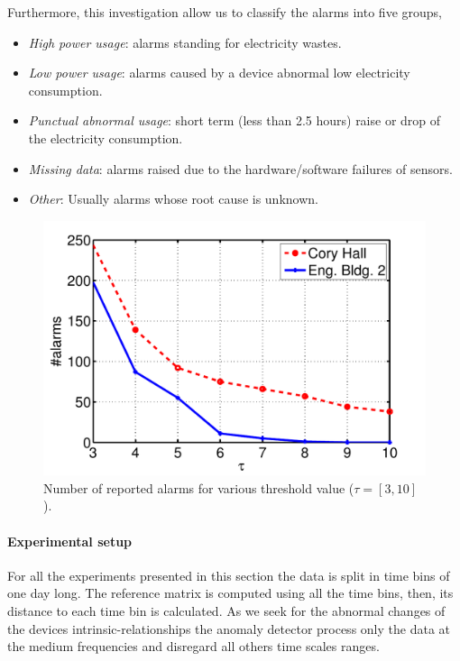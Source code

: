Furthermore, this investigation allow us to classify the alarms into five groups,
\begin{itemize}
 \item \emph{High power usage}: alarms standing for electricity wastes.
 \item \emph{Low power usage}: alarms caused by a device abnormal low electricity consumption.
 \item \emph{Punctual abnormal usage}: short term (less than 2.5 hours) raise or drop of the electricity consumption.
 \item \emph{Missing data}: alarms raised due to the hardware/software failures of sensors.
 \item \emph{Other}: Usually alarms whose root cause is unknown.
\end{itemize}


\begin{figure}
\begin{center}
 \includegraphics[width=.49\textwidth]{img/threshold-eps-converted-to.pdf}
 \caption{Number of reported alarms for various threshold value ($\tau=[3,10]$).}
 \label{fig:thres}
 \end{center}
\end{figure}

\paragraph{Experimental setup}
For all the experiments presented in this section the data is split in time bins of one day long.
The reference matrix is computed using all the time bins, then, its distance to each time bin is calculated.
As we seek for the abnormal changes of the devices intrinsic-relationships the anomaly detector process only the data at the medium frequencies and disregard all others time scales ranges.

